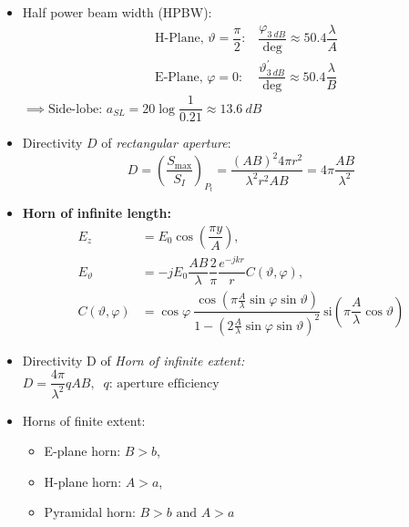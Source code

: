 \begin{itemize}
    \item Half power beam width (HPBW):
        \begin{align*}
            &\text{H-Plane, } \vartheta = \dfrac{\pi}{2} \text{:}\
            &\dfrac{\varphi_{\SI{3}{dB}}}{\mathrm{deg}} \approx 50.4 \dfrac{\lambda}{A}\\
            &\text{E-Plane, } \varphi = 0 \text{:}\
            &\dfrac{\vartheta^\prime_{\SI{3}{dB}}}{\mathrm{deg}} \approx 50.4 \dfrac{\lambda}{B}
        \end{align*}
            \(\implies \text{Side-lobe: } a_{SL} = 20 \log \dfrac{1}{0.21} \approx \SI{13.6}{dB}\)
    \item Directivity $D$ of \textit{rectangular aperture}:
        \begin{equation*}
            D = \left(\dfrac{S_{\mathrm{max}}}{S_I}\right)_{P_t} = \dfrac{(AB)^2 4\pi r^2}{\lambda^2 r^2 AB} = 4\pi \dfrac{AB}{\lambda^2}
        \end{equation*}
    \item \textbf{Horn of infinite length:}
        \begin{align*}
            E_z &= E_0 \cos\left(\dfrac{\pi y}{A}\right),\\
            E_{\vartheta} &= -jE_0 \dfrac{AB}{\lambda} \dfrac{2}{\pi} \dfrac{e^{-jkr}}{r} C(\vartheta, \varphi),\\
            C(\vartheta, \varphi) &= \cos\varphi\
            \dfrac{\cos\left(\pi \frac{A}{\lambda}\sin\varphi\sin\vartheta\right)}{1 - \left(2 \frac{A}{\lambda}\sin\varphi\sin\vartheta\right)^2}\
            \mathrm{si}\left(\pi \dfrac{A}{\lambda}\cos\vartheta\right)
        \end{align*}
    \item Directivity D of \textit{Horn of infinite extent:}\\
        \(D = \dfrac{4\pi}{\lambda^2}qAB,\;\;q \text{: aperture efficiency}\)
    \item Horns of finite extent:
        \begin{itemize}
            \itemsep0pt
            \item E-plane horn: \(B>b\),
            \item H-plane horn: \(A>a\),
            \item Pyramidal horn: \(B>b \text{ and  } A>a\)
        \end{itemize}
\end{itemize}


